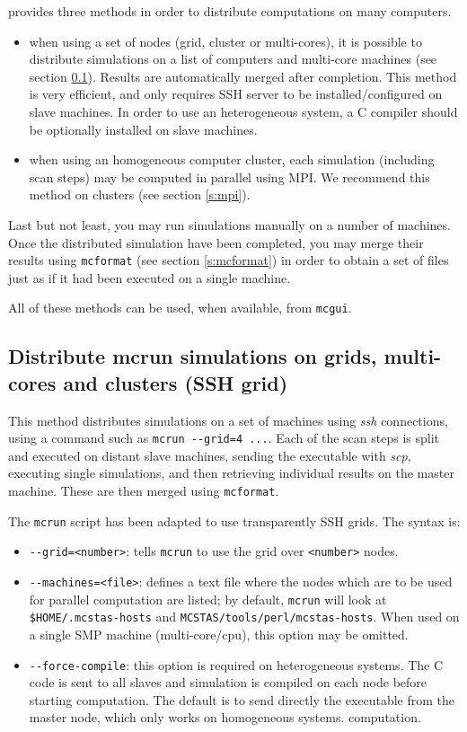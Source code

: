 \MCS provides three methods in order to distribute computations on many
computers.
\begin{itemize}
\item when using a set of nodes (grid, cluster or multi-cores), it is possible
  to distribute simulations on a list of computers and multi-core machines (see
  section \ref{s:ssh-grid}). Results are automatically merged after completion.
  This method is very efficient, and only requires SSH server to be
  installed/configured on slave machines.  In order to use an heterogeneous
  system, a C compiler should be optionally installed on slave machines.
\item when using an homogeneous computer cluster, each simulation (including
  scan steps) may be computed in parallel using MPI. We recommend this method on
  clusters (see section \ref{s:mpi}).
\end{itemize}

Last but not least, you may run simulations manually on a number of machines.
Once the distributed simulation have been completed, you may merge their results
using \verb+mcformat+ (see section \ref{s:mcformat})
in order to obtain a set of files just as if it had been executed on a single
machine.

All of these methods can be used, when available, from \texttt{mcgui}.

\subsection{Distribute mcrun simulations on grids, multi-cores and clusters (SSH
  grid)}
\label{s:ssh-grid}
This method distributes simulations on a set of machines using \emph{ssh}
connections, using a command such as \verb+mcrun --grid=4 ...+.  Each of the
scan steps is split and executed on distant slave machines, sending the
executable with \emph{scp}, executing single simulations, and then retrieving
individual results on the master machine. These are then merged using
\texttt{mcformat}.

The \verb'mcrun' script has been adapted to use transparently SSH grids. The
syntax is:
\begin{itemize}
\item \verb'--grid=<number>': tells \verb'mcrun' to use the grid over \verb'<number>' nodes.
\item \verb'--machines=<file>': defines a text file where the nodes which are to
  be used for parallel computation are listed; by default, \verb'mcrun' will
  look at \verb'$HOME/.mcstas-hosts' and
  \verb'MCSTAS/tools/perl/mcstas-hosts'. When used on a single SMP machine
  (multi-core/cpu), this option may be omitted.
\item \verb'--force-compile': this option is required on heterogeneous systems.
  The C code is sent to all slaves and simulation is compiled on each node
  before starting computation. The default is to send directly the executable
  from the master node, which only works on homogeneous systems.  computation.
\end{itemize}

